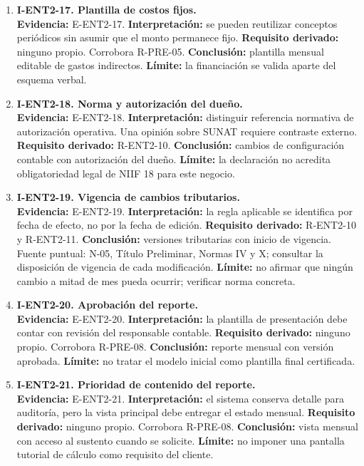 {\begin{enumerate}
  \item \textbf{I-ENT2-17. Plantilla de costos fijos.}\\
  \textbf{Evidencia:} E-ENT2-17. \textbf{Interpretación:} se pueden
  reutilizar conceptos periódicos sin asumir que el monto permanece fijo.
  \textbf{Requisito derivado:} ninguno propio. Corrobora R-PRE-05.
  \textbf{Conclusión:} plantilla mensual editable de gastos indirectos.
  \textbf{Límite:} la financiación se valida aparte del esquema verbal.

  \item \textbf{I-ENT2-18. Norma y autorización del dueño.}\\
  \textbf{Evidencia:} E-ENT2-18. \textbf{Interpretación:} distinguir
  referencia normativa de autorización operativa. Una opinión sobre SUNAT
  requiere contraste externo. \textbf{Requisito derivado:} R-ENT2-10.
  \textbf{Conclusión:} cambios de configuración contable con autorización del
  dueño. \textbf{Límite:} la declaración no acredita obligatoriedad legal de
  NIIF 18 para este negocio.

  \item \textbf{I-ENT2-19. Vigencia de cambios tributarios.}\\
  \textbf{Evidencia:} E-ENT2-19. \textbf{Interpretación:} la regla aplicable
  se identifica por fecha de efecto, no por la fecha de edición.
  \textbf{Requisito derivado:} R-ENT2-10 y R-ENT2-11. \textbf{Conclusión:}
  versiones tributarias con inicio de vigencia. Fuente puntual: N-05, Título
  Preliminar, Normas IV y X; consultar la disposición de vigencia de cada
  modificación. \textbf{Límite:} no afirmar que ningún cambio a mitad de mes
  pueda ocurrir; verificar norma concreta.

  \item \textbf{I-ENT2-20. Aprobación del reporte.}\\
  \textbf{Evidencia:} E-ENT2-20. \textbf{Interpretación:} la plantilla de
  presentación debe contar con revisión del responsable contable.
  \textbf{Requisito derivado:} ninguno propio. Corrobora R-PRE-08.
  \textbf{Conclusión:} reporte mensual con versión aprobada.
  \textbf{Límite:} no tratar el modelo inicial como plantilla final
  certificada.

  \item \textbf{I-ENT2-21. Prioridad de contenido del reporte.}\\
  \textbf{Evidencia:} E-ENT2-21. \textbf{Interpretación:} el sistema
  conserva detalle para auditoría, pero la vista principal debe entregar el
  estado mensual. \textbf{Requisito derivado:} ninguno propio. Corrobora
  R-PRE-08. \textbf{Conclusión:} vista mensual con acceso al sustento cuando
  se solicite. \textbf{Límite:} no imponer una pantalla tutorial de cálculo
  como requisito del cliente.


\end{enumerate}}
